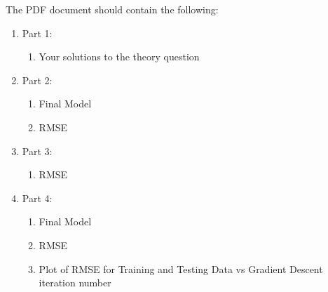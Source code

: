 \documentclass[12pt]{article}
\begin{document}
\noindent
The PDF document should contain the following:

\begin{enumerate}
\item Part 1:
	\begin{enumerate}
	\item Your solutions to the theory question
	\end{enumerate}
\item Part 2:
	\begin{enumerate}
	\item Final Model
	\item RMSE
	\end{enumerate}
\item Part 3:
	\begin{enumerate}
	\item RMSE
	\end{enumerate}	
\item Part 4:
	\begin{enumerate}
	\item Final Model
	\item RMSE
	\item Plot of RMSE for Training and Testing Data vs Gradient Descent iteration number
	\end{enumerate}
\end{enumerate}
\end{document}
